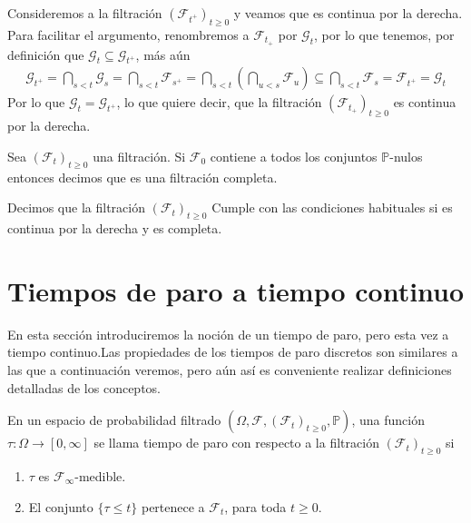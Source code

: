 Consideremos a la filtración $(\mathcal{F}_{t^{+}})_{t \geq 0}$ y veamos que es continua por la derecha. Para facilitar el argumento, renombremos a $\mathcal{F}_{t_{+}}$ por $\mathcal{G}_t$, por lo que tenemos, por definición que $\mathcal{G}_t \subseteq \mathcal{G}_{t^{+}}$, más aún
	\begin{align*}
	\mathcal{G}_{t^{+}} = \bigcap_{s < t} \mathcal{G}_s = \bigcap_{s < t} \mathcal{F}_{s^{+}} = \bigcap_{s < t}  \left( \bigcap_{u < s} \mathcal{F}_u \right) \subseteq \bigcap_{s < t} \mathcal{F}_s = \mathcal{F}_{t^{+}} = \mathcal{G}_t
	\end{align*}
Por lo que $\mathcal{G}_t  = \mathcal{G}_{t^{+}}$, lo que quiere decir, que la filtración $(\mathcal{F}_{t_{+}})_{t \geq 0}$ es continua por la derecha. \\

\begin{definition}
	Sea $(\mathcal{F}_t )_{t \geq 0}$ una filtración. Si $\mathcal{F}_0$ contiene a todos los conjuntos $\mathbb{P}$-nulos entonces decimos que es una filtración completa.
\end{definition}

\begin{definition}
	Decimos que la filtración $(\mathcal{F}_t )_{t \geq 0}$ Cumple con las condiciones habituales si es continua por la derecha y es completa.
\end{definition}

\section{Tiempos de paro a tiempo continuo}
En esta sección introduciremos la noción de un tiempo de paro, pero esta vez a tiempo continuo.Las propiedades de los tiempos de paro discretos son similares a las que a continuación veremos, pero aún así es conveniente realizar definiciones detalladas de los conceptos.

\begin{definition}
	En un espacio de probabilidad filtrado $(\Omega, \mathcal{F}, (\mathcal{F}_t)_{t \geq 0}, \mathbb{P})$, una función $\tau : \Omega \rightarrow [0, \infty]$ se llama tiempo de paro con respecto a la filtración $(\mathcal{F}_t)_{t \geq 0}$ si
	\begin{enumerate}
		\item $\tau$ es $\mathcal{F}_{\infty}$-medible.
		\item El conjunto $\{ \tau \leq t \}$ pertenece a $\mathcal{F}_t$, para toda $t \geq 0$.
	\end{enumerate}
\end{definition}


